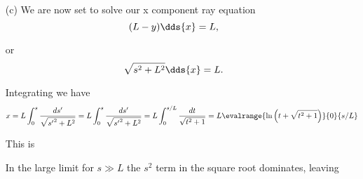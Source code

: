 {\begin{enumerate}

In the large limit for \(s \gg L\) the \(s^2\) term dominates, leaving


A plot of \(y/L\), \(-s/L\), and \(-s^2/2 L^2\) can be found in \cref{fig:modernOpticsProblemSet1:modernOpticsProblemSet1Fig2b} and \cref{fig:modernOpticsProblemSet1:modernOpticsProblemSet1Fig2bBig}.
%

\item[(c)]
We are now set to solve our x component ray equation
%
\begin{dmath}\label{eqn:modernOpticsProblemSet1P2:290}
(L - y) \dds{x} = L,
\end{dmath}

or
\begin{dmath}\label{eqn:modernOpticsProblemSet1P2:310}
\sqrt{s^2 + L^2} \dds{x} = L.
\end{dmath}

Integrating we have
%
\begin{dmath}\label{eqn:modernOpticsProblemSet1P2:330}
x
= L \int_0^s \frac{ds'}{\sqrt{{s'}^2 + L^2}}
= L \int_0^s \frac{ds'}{\sqrt{{s'}^2 + L^2}}
= L \int_0^{s/L} \frac{dt}{\sqrt{t^2 + 1}}
= L \evalrange{ \ln\left( t + \sqrt{ t^2 + 1} \right) }{0}{s/L}
\end{dmath}

This is


In the large limit for \(s \gg L\) the \(s^2\) term in the square root dominates, leaving



\end{enumerate}}
